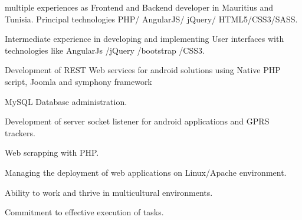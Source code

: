 \begin{cventries}
  \cventry
    {}
    {}
    {}
    {}
    {
      \begin{cvitems}
        \item {multiple experiences as Frontend and Backend developer in Mauritius and Tunisia. Principal technologies PHP/ AngularJS/ jQuery/ HTML5/CSS3/SASS.}
        \item {Intermediate experience in developing and implementing User interfaces with technologies like AngularJs /jQuery /bootstrap /CSS3.}        
        \item {Development of REST Web services for android solutions using Native PHP script, Joomla and symphony framework}
        \item {MySQL Database administration.}
        \item {Development of server socket listener for android applications and GPRS trackers.} \item {Web scrapping with PHP.}   
        \item {Managing the deployment of web applications on Linux/Apache environment.} 
        \item {Ability to work and thrive in multicultural environments.} 
        \item {Commitment to effective execution of tasks.}         
      \end{cvitems}
    }
\end{cventries}